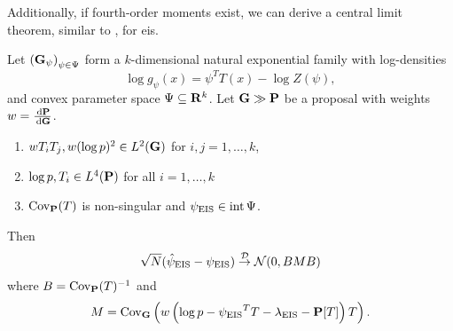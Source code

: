 Additionally, if fourth-order moments exist, we can derive a central limit theorem, similar to , for \acrshort{eis}.

\begin{theorem}
    \label{thm:eis-clt}
    Let $\left( \G_{\psi} \right)_{\psi \in \Psi}$ form a $k$-dimensional natural exponential family with log-densities 
    $$
    \log g_{\psi}(x) = \psi^{T} T(x) - \log Z(\psi),
    $$
    and convex parameter space $\Psi \subseteq \R^{k}$. Let $\G \gg \P$ be a proposal with weights $w = \rnd{\P}{\G}$. 

    \begin{enumerate}
        \item\label{it:secondISmomentsexist}$w T_{i}T_{j}, w (\log p)^{2} \in L^{2}(\G)$ for $i,j = 1, \dots, k$,
        \item\label{it:fourthmomentsexist} $\log p, T_i \in L^{4}(\P)$ for all $i = 1, \dots, k$
        \item $\cov_{\P}(T)$ is non-singular and $\peis \in \operatorname{int} \Psi$.
    \end{enumerate}

    Then 
    $$
        \sqrt{N} (\hpeis - \peis) \convD \Normal (0, BMB)
    $$
    where $B = \cov_{\P}(T)^{-1}$ and 
    $$
    M = \cov_{\G} \left( w \left( \log p - \peis^{T}T - \lambda_{\eis} - \P[T] \right)T \right).
    $$
\end{theorem}

